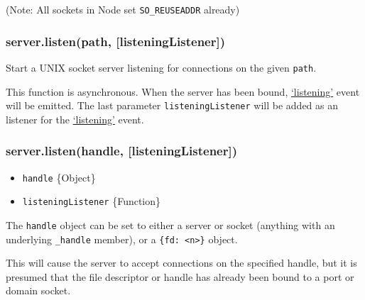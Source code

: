 \begin{Shaded}
\begin{Highlighting}[]
\NormalTok{(}\NormalTok{, } 
   \NormalTok{(} \NormalTok{== }\NormalTok{) \{}
    \NormalTok{(}\NormalTok{);}
     \NormalTok{() \{}
      \NormalTok{();}
    \NormalTok{\}, }\NormalTok{);}
  \NormalTok{\}}
\NormalTok{\});}
\end{Highlighting}
\end{Shaded}

(Note: All sockets in Node set \texttt{SO\_REUSEADDR} already)

\subsubsection{server.listen(path, {[}listeningListener{]})}

Start a UNIX socket server listening for connections on the given
\texttt{path}.

This function is asynchronous. When the server has been bound,
\hyperref[net_event_listening]{`listening'} event will be emitted. The
last parameter \texttt{listeningListener} will be added as an listener
for the \hyperref[net_event_listening]{`listening'} event.

\subsubsection{server.listen(handle, {[}listeningListener{]})}

\begin{itemize}
\item
  \texttt{handle} \{Object\}
\item
  \texttt{listeningListener} \{Function\}
\end{itemize}

The \texttt{handle} object can be set to either a server or socket
(anything with an underlying \texttt{\_handle} member), or a
\texttt{\{fd: \textless{}n\textgreater{}\}} object.

This will cause the server to accept connections on the specified
handle, but it is presumed that the file descriptor or handle has
already been bound to a port or domain socket.

